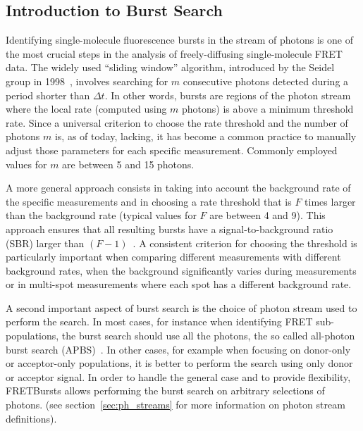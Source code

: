 \subsection{Introduction to Burst Search}
\label{sec:burstsearch_intro}

Identifying single-molecule fluorescence bursts in the stream of photons is
one of the most crucial steps in the analysis of freely-diffusing single-molecule FRET data.
The widely used ``sliding window'' algorithm, introduced by the Seidel group in 
1998~\cite{Eggeling_1998,Fries_1998}, involves searching for
$m$ consecutive photons detected during a period shorter than
$\Delta t$. In other words, bursts are regions of the photon stream where the
local rate (computed using $m$ photons) is above a minimum threshold rate.
Since a universal criterion to choose the rate threshold and
the number of photons $m$ is, as of today, lacking, it has become a common
practice to manually adjust those parameters for each specific measurement.
Commonly employed values for $m$ are between 5 and 15 photons.

A more general approach consists in taking into account the background rate of
the specific measurements and in choosing a rate threshold that is $F$ times
larger than the background rate (typical values for $F$ are between 4 and 9). 
This approach ensures that all resulting bursts
have a signal-to-background ratio (SBR) larger than
$(F-1)$~\cite{Michalet_2012}. A consistent criterion for choosing the threshold is
particularly important when comparing different measurements with different background
rates, when the background significantly varies during measurements or in
multi-spot measurements where each spot has a different background rate.

A second important aspect of burst search is the choice of photon stream used
to perform the search.
In most cases, for instance when identifying FRET sub-populations,
the burst search should use all the photons, the so called
all-photon burst search (APBS)~\cite{Eggeling_1998,Fries_1998,Nir_2006}.
In other cases, for example when focusing on
donor-only or acceptor-only populations, it is better to perform 
the search using only donor or acceptor signal.
In order to handle the general case and to provide flexibility,
FRETBursts allows performing the burst search on arbitrary selections of photons.
(see section~\ref{sec:ph_streams} for more information on photon stream definitions).

